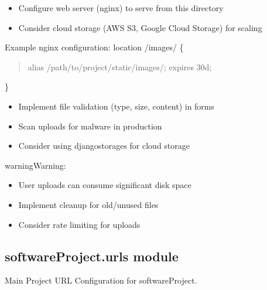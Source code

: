 \documentclass[letterpaper,10pt,english]{sphinxmanual}
\begin{document}
\begin{fulllineitems}
\begin{description}
\begin{itemize}
\item {} 
\sphinxAtStartPar
Configure web server (nginx) to serve from this directory

\item {} 
\sphinxAtStartPar
Consider cloud storage (AWS S3, Google Cloud Storage) for scaling

\end{itemize}

\sphinxAtStartPar
Example nginx configuration:
location /images/ \{
\begin{quote}

\sphinxAtStartPar
alias /path/to/project/static/images/;
expires 30d;
\end{quote}

\sphinxAtStartPar
\}

\begin{itemize}
\item {} 
\sphinxAtStartPar
Implement file validation (type, size, content) in forms

\item {} 
\sphinxAtStartPar
Scan uploads for malware in production

\item {} 
\sphinxAtStartPar
Consider using django\sphinxhyphen{}storages for cloud storage

\end{itemize}

\end{description}

\begin{sphinxadmonition}{warning}{Warning:}\begin{itemize}
\item {} 
\sphinxAtStartPar
User uploads can consume significant disk space

\item {} 
\sphinxAtStartPar
Implement cleanup for old/unused files

\item {} 
\sphinxAtStartPar
Consider rate limiting for uploads

\end{itemize}
\end{sphinxadmonition}

\end{fulllineitems}



\subsection{softwareProject.urls module}
\label{\detokenize{softwareProject:module-softwareProject.urls}}\label{\detokenize{softwareProject:softwareproject-urls-module}}
\sphinxAtStartPar
Main Project URL Configuration for softwareProject.
\end{document}
